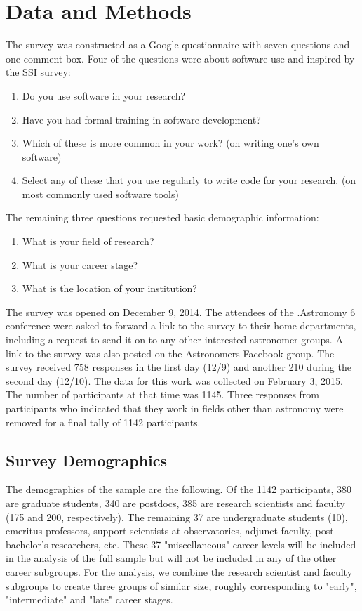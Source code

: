 \section{Data and Methods}
\label{sec:datamethods}

The survey was constructed as a Google questionnaire with seven questions and one comment box. Four of the questions were about software use and inspired by the SSI survey:
\begin{enumerate}
\item Do you use software in your research?
\item Have you had formal training in software development?
\item Which of these is more common in your work? (on writing one's own software)
\item Select any of these that you use regularly to write code for your research. (on most commonly used software tools)
\end{enumerate}
The remaining three questions requested basic demographic information:
\begin{enumerate}
\item What is your field of research?
\item What is your career stage?
\item What is the location of your institution?
\end{enumerate}

The survey was opened on December 9, 2014. The attendees of the .Astronomy 6 conference were asked to forward a link to the survey to their home departments, including a request to send it on to any other interested astronomer groups. A link to the survey was also posted on the Astronomers Facebook group. The survey received 758 responses in the first day (12/9) and another 210 during the second day (12/10). The data for this work was collected on February 3, 2015. The number of participants at that time was 1145. Three responses from participants who indicated that they work in fields other than astronomy were removed for a final tally of 1142 participants.

\subsection{Survey Demographics}

The demographics of the sample are the following. Of the 1142 participants, 380 are graduate students, 340 are postdocs, 385 are research scientists and faculty (175 and 200, respectively). The remaining 37 are undergraduate students (10), emeritus professors, support scientists at observatories, adjunct faculty, post-bachelor's researchers, etc. These 37 "miscellaneous" career levels will be included in the analysis of the full sample but will not be included in any of the other career subgroups. For the analysis, we combine the research scientist and faculty subgroups to create three groups of similar size, roughly corresponding to "early", "intermediate" and "late" career stages.

